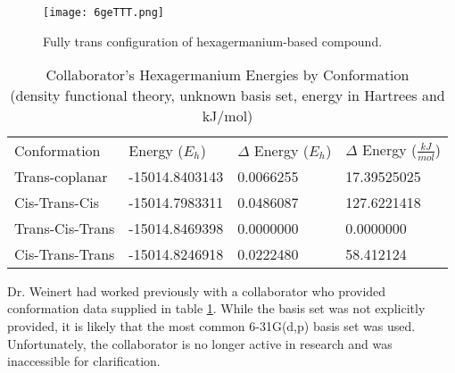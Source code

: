 \begin{figure}
	
	\centering
	
	\texttt{[image: 6geTTT.png]}
	
	\caption{Fully trans configuration of hexagermanium-based compound.}
	
	\label{fig:Ge6TransAll}
	
\end{figure}
\begin{table}[]
	
	\centering
	\begin{tabular}{llll}
		Conformation & Energy ($E_{h}$)    & $\Delta$ Energy ($E_{h}$) & $\Delta$ Energy ($\frac{kJ}{mol}$) \\ \cline{1-4} 
		Trans-coplanar        & -15014.8403143 & 0.0066255            & 17.39525025                        \\
		Cis-Trans-Cis         & -15014.7983311 & 0.0486087            & 127.6221418                        \\
		Trans-Cis-Trans       & -15014.8469398 & 0.0000000            & 0.0000000                                  \\
		Cis-Trans-Trans       & -15014.8246918 & 0.0222480            & 58.412124                         
	\end{tabular}
	\caption{Collaborator's Hexagermanium Energies by Conformation \\ (density functional theory, unknown basis set, energy in Hartrees and kJ/mol)}
	
	\label{tab:Ge6CollabEnergies}
	
\end{table}
Dr. Weinert had worked previously with a collaborator who provided conformation data supplied in table \ref{tab:Ge6CollabEnergies}.
While the basis set was not explicitly provided, it is likely that the most common 6-31G(d,p) basis set was used. 
Unfortunately, the collaborator is no longer active in research and was inaccessible for clarification.

